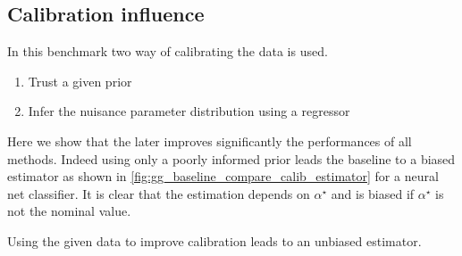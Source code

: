 






\subsection{Calibration influence} %
\label{sub:calibration_influence}



In this benchmark two way of calibrating the data is used.
\begin{enumerate}
  \item Trust a given prior
  \item Infer the nuisance parameter distribution using a regressor
\end{enumerate}

Here we show that the later improves significantly the performances of all methods.
Indeed using only a poorly informed prior leads the baseline to a biased estimator as shown in \autoref{fig:gg_baseline_compare_calib_estimator} for a neural net classifier.
It is clear that the estimation depends on $\alpha^\star$ and is biased if $\alpha^\star$ is not the nominal value.

Using the given data to improve calibration leads to an unbiased estimator.




